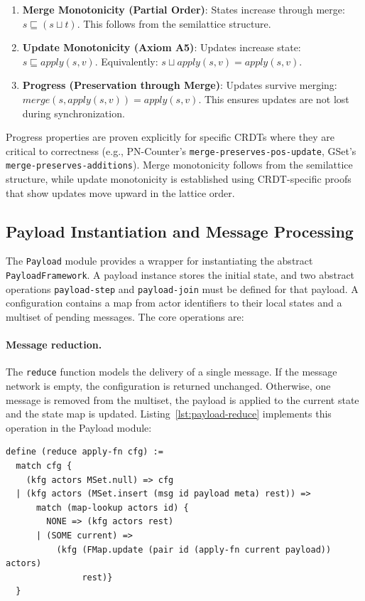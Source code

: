 \begin{enumerate}
\item \textbf{Merge Monotonicity (Partial Order)}: States increase through merge: $s \sqsubseteq (s \sqcup t)$. This follows from the semilattice structure.
  
\item \textbf{Update Monotonicity (Axiom A5)}: Updates increase state: $s \sqsubseteq \mathit{apply}(s, v)$. Equivalently: $s \sqcup \mathit{apply}(s, v) = \mathit{apply}(s, v)$.
  
\item \textbf{Progress (Preservation through Merge)}: Updates survive merging: $\mathit{merge}(s, \mathit{apply}(s, v)) = \mathit{apply}(s, v)$. This ensures updates are not lost during synchronization.
\end{enumerate}

Progress properties are proven explicitly for specific CRDTs where they are critical to correctness (e.g., PN-Counter's \texttt{merge-preserves-pos-update}, GSet's \texttt{merge-preserves-additions}). Merge monotonicity follows from the semilattice structure, while update monotonicity is established using CRDT-specific proofs that show updates move upward in the lattice order.

\subsection{Payload Instantiation and Message Processing}

The \texttt{Payload} module provides a wrapper for instantiating the abstract \texttt{PayloadFramework}. A payload instance stores the initial state, and two abstract operations \texttt{payload-step} and \texttt{payload-join} must be defined for that payload. A configuration contains a map from actor identifiers to their local states and a multiset of pending messages. The core operations are:

\paragraph{Message reduction.}  The \texttt{reduce} function models the delivery of a single message. If the message network is empty, the configuration is returned unchanged. Otherwise, one message is removed from the multiset, the payload is applied to the current state and the state map is updated. Listing~\ref{lst:payload-reduce} implements this operation in the Payload module:\\
\begin{lstlisting}[language=Athena,style=athena,label={lst:payload-reduce},caption={Message reduction in Payload module}]
define (reduce apply-fn cfg) :=
  match cfg {
    (kfg actors MSet.null) => cfg
  | (kfg actors (MSet.insert (msg id payload meta) rest)) =>
      match (map-lookup actors id) {
        NONE => (kfg actors rest)
      | (SOME current) =>
          (kfg (FMap.update (pair id (apply-fn current payload)) actors)
               rest)}
  }
\end{lstlisting}

